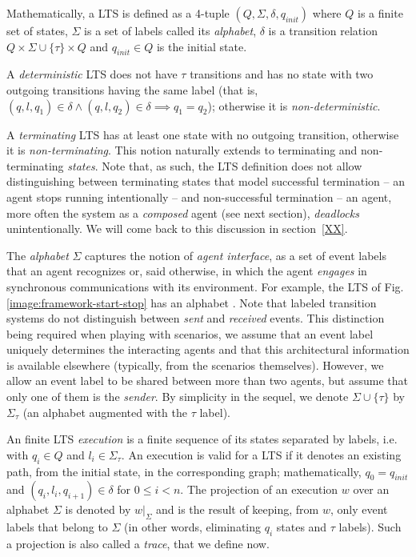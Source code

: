 Mathematically, a LTS is defined as a 4-tuple $(Q,\Sigma,\delta,q_{init})$ where $Q$ is a finite set of states, $\Sigma$ is a set of labels called its \emph{alphabet}, $\delta$ is a transition relation $Q \times \Sigma\cup\{\tau\} \times Q$ and $q_{init} \in Q$ is the initial state.

A \emph{deterministic} LTS does not have $\tau$ transitions and has no state with two outgoing transitions having the same label (that is, $(q,l,q_1) \in \delta \wedge (q,l,q_2) \in \delta \implies q_1 = q_2$); otherwise it is \emph{non-deterministic}.

A \emph{terminating} LTS has at least one state with no outgoing transition, otherwise it is \emph{non-terminating}. This notion naturally extends to terminating and non-terminating \emph{states}. Note that, as such, the LTS definition does not allow distinguishing between terminating states that model successful termination -- an agent stops running intentionally -- and non-successful termination -- an agent, more often the system as a \emph{composed} agent (see next section), \emph{deadlocks} unintentionally. We will come back to this discussion in section~\ref{XX}.

The \emph{alphabet} $\Sigma$ captures the notion of \emph{agent interface}, as a set of event labels that an agent recognizes or, said otherwise, in which the agent \emph{engages} in synchronous communications with its environment. For example, the LTS of Fig.\ref{image:framework-start-stop} has an alphabet . Note that labeled transition systems do not distinguish between \emph{sent} and \emph{received} events. This distinction being required when playing with scenarios, we assume that an event label uniquely determines the interacting agents and that this architectural information is available elsewhere (typically, from the scenarios themselves). However, we allow an event label to be shared between more than two agents, but assume that only one of them is the \emph{sender}. By simplicity in the sequel, we denote $\Sigma\cup\{\tau\}$ by $\Sigma_{\tau}$ (an alphabet augmented with the $\tau$ label).

An finite LTS \emph{execution} is a finite sequence of its states separated by labels, i.e.  with $q_i \in Q$ and $l_i \in \Sigma_{\tau}$. An execution is valid for a LTS if it denotes an existing path, from the initial state, in the corresponding graph; mathematically, $q_0 = q_{init}$ and $(q_i,l_i,q_{i+1}) \in \delta$ for $0 \leq i < n$. The projection of an execution $w$ over an alphabet $\Sigma$ is denoted by $w|_{\Sigma}$ and is the result of keeping, from $w$, only event labels that belong to $\Sigma$ (in other words, eliminating $q_i$ states and $\tau$ labels). Such a projection is also called a \emph{trace}, that we define now.

